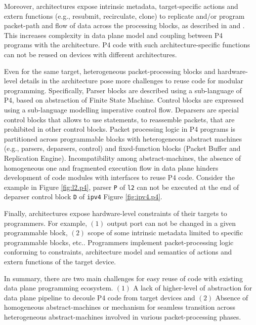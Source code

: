 Moreover, architectures expose intrinsic metadata, target-specific actions and extern functions (e.g., resubmit, recirculate, clone) to replicate and/or program packet-path and flow of data across the processing blocks, as described in \cite{simple_switch.md} and \cite{psa}.
This increases complexity in data plane model and coupling between P4 programs with the architecture.
P4 code with such architecture-specific functions can not be reused on devices with different architectures.

Even for the same target, heterogeneous packet-processing blocks and hardware-level details in the architecture pose more challenges to reuse code for modular programming.
Specifically, Parser blocks are described using a sub-language of P4, based on abstraction of Finite State Machine.
Control blocks are expressed using a sub-language modelling imperative control flow.
Deparsers are special control blocks that allows to use statements, to reassemble packets, that are prohibited in other control blocks.
Packet processing logic in P4 programs is partitioned across programmable blocks with heterogeneous abstract machines (e.g., parsers, deparsers, control) and fixed-function blocks (Packet Buffer and Replication Engine).
Incompatibility among abstract-machines, the absence of homogeneous one and fragmented execution flow in data plane hinders development of code modules with interfaces to reuse P4 code.
Consider the example in Figure \ref{fig:l2.p4}, parser \texttt{P} of \texttt{l2} can not be executed at the end of deparser control block \texttt{D} of \texttt{ipv4} Figure \ref{fig:ipv4.p4}.

Finally, architectures expose hardware-level constraints of their targets to programmers.
For example, $(1)$ output port can not be changed in a given programmable block, $(2)$ scope of some intrinsic metadata limited to specific programmable blocks, etc..
Programmers implement packet-processing logic conforming to constraints, architecture model and semantics of actions and extern functions of the target device.


In summary, there are two main challenges for easy reuse of code with existing data plane programming ecosystem.
$(1)$ A lack of higher-level of abstraction for data plane pipeline to decoule P4 code from target devices and $(2)$ Absence of homogeneous abstract-machines or mechanism for seamless transition across heterogeneous abstract-machines involved in various packet-processing phases.


